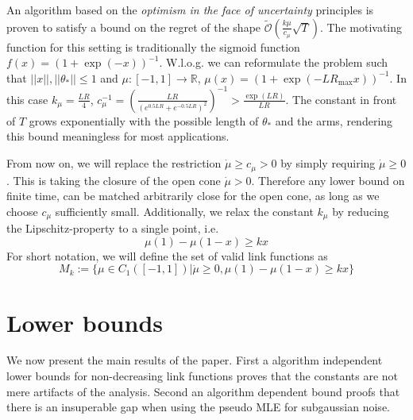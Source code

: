 \documentclass[twoside]{article} \usepackage{aistats2017}
\begin{document}
An algorithm based on the \textit{optimism in the face of uncertainty} principles is proven to satisfy a bound on the regret of the shape $\tilde{\mathcal{O}}(\frac{k\mu}{c_\mu}\sqrt{T})$. 
The motivating function for this setting is traditionally the sigmoid function $f(x) = (1+\exp(-x))^{-1}$.
W.l.o.g. we can reformulate the problem such that $||x||,||\theta_*||\leq 1$ and $\mu:[-1,1]\rightarrow\mathbb{R}$,
$\mu(x) = (1+\exp(-LR_{\max}x))^{-1}$.
In this case $k_\mu = \frac{LR}{4}$, $c_\mu^{-1} = \left(\frac{LR}{(e^{0.5LR}+e^{-0.5LR})^2}\right)^{-1} > \frac{\exp(LR)}{LR}$. The constant in front of $T$ grows exponentially with the possible length of $\theta_*$ and the arms, rendering this bound meaningless for most applications.

From now on, we will replace the restriction $\dot{\mu}\geq c_\mu >0$ by simply requiring $\dot{\mu}\geq0$. This is taking the closure of the open cone $\dot{\mu}>0$. Therefore any lower bound on finite time, can be matched arbitrarily close for the open cone, as long as we choose $c_\mu$ sufficiently small.
Additionally, we relax the constant $k_\mu$ by reducing the Lipschitz-property to a single point, i.e.
$$\mu(1)-\mu(1-x)\geq kx$$
For short notation, we will define the set of valid link functions as
$$M_k := \{\mu \in C_1([-1,1]) | \dot{\mu}\geq 0, \mu(1)-\mu(1-x)\geq kx\}$$

\section{Lower bounds} \label{lowerBounds}

We now present the main results of the paper. First a algorithm independent lower bounds for non-decreasing link functions proves that the constants are not mere artifacts of the analysis. Second an algorithm dependent bound proofs that there is an insuperable gap when using the pseudo MLE for subgaussian noise.
\end{document}
